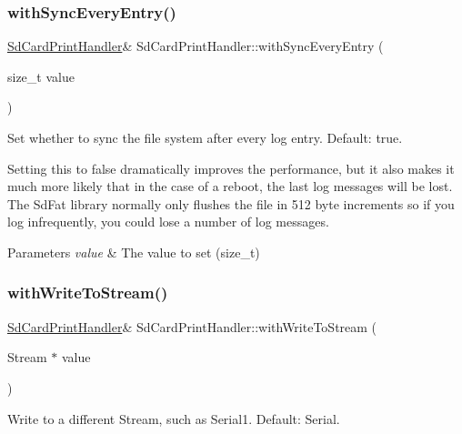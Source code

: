 \subsubsection{\texorpdfstring{with\+Sync\+Every\+Entry()}{withSyncEveryEntry()}}
{\footnotesize\ttfamily \mbox{\hyperlink{class_sd_card_print_handler}{Sd\+Card\+Print\+Handler}}\& Sd\+Card\+Print\+Handler\+::with\+Sync\+Every\+Entry (\begin{DoxyParamCaption}\item[{size\+\_\+t}]{value }\end{DoxyParamCaption})\hspace{0.3cm}{\ttfamily [inline]}}



Set whether to sync the file system after every log entry. Default\+: true. 

Setting this to false dramatically improves the performance, but it also makes it much more likely that in the case of a reboot, the last log messages will be lost. The Sd\+Fat library normally only flushes the file in 512 byte increments so if you log infrequently, you could lose a number of log messages.


\begin{DoxyParams}{Parameters}
{\em value} & The value to set (size\+\_\+t) \\
\hline
\end{DoxyParams}
\mbox{\label{class_sd_card_print_handler_acdb2ef1ae77acdfd9c3d355548c94750}} 
\subsubsection{\texorpdfstring{with\+Write\+To\+Stream()}{withWriteToStream()}}
{\footnotesize\ttfamily \mbox{\hyperlink{class_sd_card_print_handler}{Sd\+Card\+Print\+Handler}}\& Sd\+Card\+Print\+Handler\+::with\+Write\+To\+Stream (\begin{DoxyParamCaption}\item[{Stream $\ast$}]{value }\end{DoxyParamCaption})\hspace{0.3cm}{\ttfamily [inline]}}



Write to a different Stream, such as Serial1. Default\+: Serial. 


